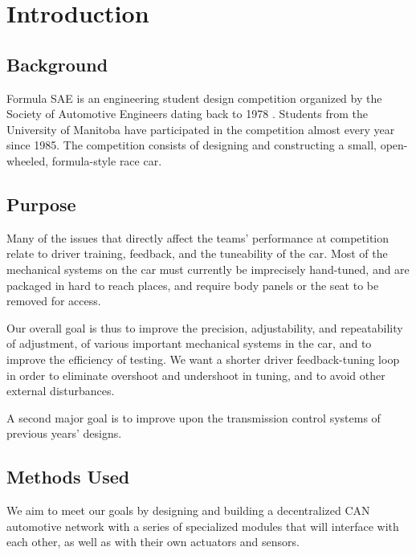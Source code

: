 %
%
%
%

\chapter{Introduction}

\section{Background}

Formula SAE is
an engineering student design competition organized by the Society
of Automotive Engineers dating back to 1978 \cite{fsaehistory}. Students
from the University of Manitoba have participated in the competition
almost every year since 1985. The competition consists of designing
and constructing a small, open-wheeled, formula-style race car.

\section{Purpose}

Many of the issues that directly affect the teams' performance at
competition relate to driver training, feedback, and the tuneability
of the car. Most of the mechanical systems on the car must currently
be imprecisely hand-tuned, and are packaged in hard to reach places,
and require body panels or the seat to be removed for access.

Our overall goal is thus to improve the precision, adjustability, and
repeatability of adjustment, of various important mechanical systems
in the car, and to improve the efficiency of testing. We want a shorter
driver feedback-tuning loop in order to eliminate
overshoot and undershoot in tuning, and to avoid other external disturbances.

A second major goal is to improve upon the transmission control systems
of previous years' designs.


\section{Methods Used}

We aim to meet our goals by designing and building a decentralized CAN
automotive network with a series of specialized modules that will interface
with each other, as well as with their own actuators and sensors.